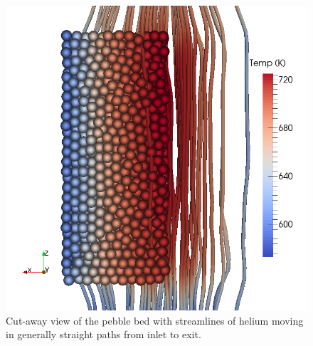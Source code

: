\begin{figure}[t]
    \centering
    \includegraphics[width=\singleimagewidth]{figures/cfd-dem-streamlines2}
    \caption{Cut-away view of the pebble bed with streamlines of helium moving in generally straight paths from inlet to exit.}\label{fig:cfdem-streamlines}
\end{figure}


